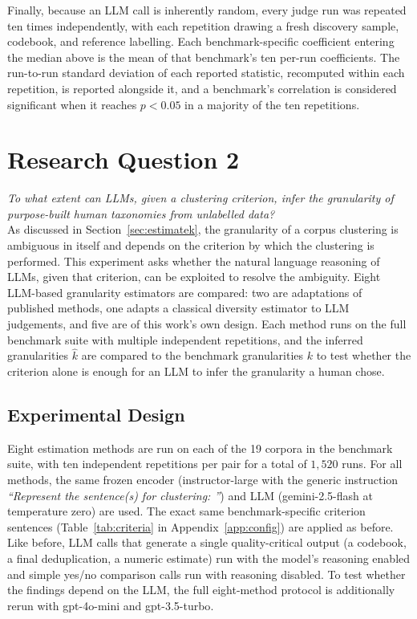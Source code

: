 \documentclass[11pt,a4paper,oneside]{report}
\begin{document}
Finally, because an LLM call is inherently random, every judge run was repeated ten times independently, with each repetition drawing a fresh discovery sample, codebook, and reference labelling. Each benchmark-specific coefficient entering the median above is the mean of that benchmark's ten per-run coefficients. The run-to-run standard deviation of each reported statistic, recomputed within each repetition, is reported alongside it, and a benchmark's correlation is considered significant when it reaches $p < 0.05$ in a majority of the ten repetitions.

\section{Research Question 2}

\emph{To what extent can LLMs, given a clustering criterion, infer the granularity of purpose-built human taxonomies from unlabelled data?}\\

As discussed in Section~\ref{sec:estimatek}, the granularity of a corpus clustering is ambiguous in itself and depends on the criterion by which the clustering is performed. This experiment asks whether the natural language reasoning of LLMs, given that criterion, can be exploited to resolve the ambiguity. Eight LLM-based granularity estimators are compared: two are adaptations of published methods, one adapts a classical diversity estimator to LLM judgements, and five are of this work's own design. Each method runs on the full benchmark suite with multiple independent repetitions, and the inferred granularities $\hat{k}$ are compared to the benchmark granularities $k$ to test whether the criterion alone is enough for an LLM to infer the granularity a human chose.

\subsection{Experimental Design}\label{sec:RQ2_DESIGN}

Eight estimation methods are run on each of the 19 corpora in the benchmark suite, with ten independent repetitions per pair for a total of $1{,}520$ runs. For all methods, the same frozen encoder ({\small\ttfamily instructor-large} with the generic instruction \emph{``Represent the sentence(s) for clustering: ''}) and LLM ({\small\ttfamily gemini-2.5-flash} at temperature zero) are used. The exact same benchmark-specific criterion sentences (Table~\ref{tab:criteria} in Appendix~\ref{app:config}) are applied as before. Like before, LLM calls that generate a single quality-critical output (a codebook, a final deduplication, a numeric estimate) run with the model's reasoning enabled and simple yes/no comparison calls run with reasoning disabled. To test whether the findings depend on the LLM, the full eight-method protocol is additionally rerun with {\small\ttfamily gpt-4o-mini} and {\small\ttfamily gpt-3.5-turbo}.
\end{document}
